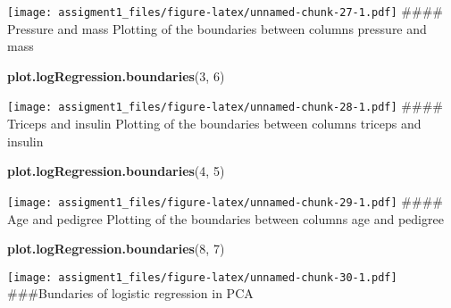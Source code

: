 \documentclass[
]{article}
\newenvironment{Shaded}{\begin{snugshade}}{\end{snugshade}}
\newcommand{\DecValTok}[1]{\textcolor[rgb]{0.00,0.00,0.81}{#1}}
\newcommand{\KeywordTok}[1]{\textcolor[rgb]{0.13,0.29,0.53}{\textbf{#1}}}
\newcommand{\NormalTok}[1]{#1}
\begin{document}
\texttt{[image: assigment1\_files/figure-latex/unnamed-chunk-27-1.pdf]}
\#\#\#\# Pressure and mass Plotting of the boundaries between columns
pressure and mass

\begin{Shaded}
\begin{Highlighting}[]
\KeywordTok{plot.logRegression.boundaries}\NormalTok{(}\DecValTok{3}\NormalTok{, }\DecValTok{6}\NormalTok{)}
\end{Highlighting}
\end{Shaded}

\texttt{[image: assigment1\_files/figure-latex/unnamed-chunk-28-1.pdf]}
\#\#\#\# Triceps and insulin Plotting of the boundaries between columns
triceps and insulin

\begin{Shaded}
\begin{Highlighting}[]
\KeywordTok{plot.logRegression.boundaries}\NormalTok{(}\DecValTok{4}\NormalTok{, }\DecValTok{5}\NormalTok{)}
\end{Highlighting}
\end{Shaded}

\texttt{[image: assigment1\_files/figure-latex/unnamed-chunk-29-1.pdf]}
\#\#\#\# Age and pedigree Plotting of the boundaries between columns age
and pedigree

\begin{Shaded}
\begin{Highlighting}[]
\KeywordTok{plot.logRegression.boundaries}\NormalTok{(}\DecValTok{8}\NormalTok{, }\DecValTok{7}\NormalTok{)}
\end{Highlighting}
\end{Shaded}

\texttt{[image: assigment1\_files/figure-latex/unnamed-chunk-30-1.pdf]}
\#\#\#Bundaries of logistic regression in PCA
\end{document}
